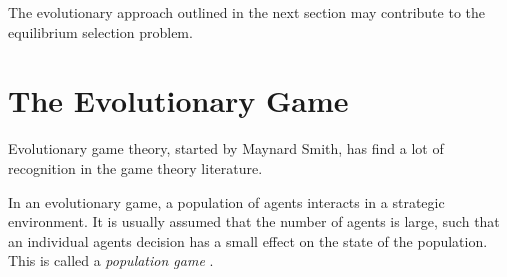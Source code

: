 \documentclass[11pt]{article}
\begin{document}
The evolutionary approach outlined in the next section may contribute to 
the equilibrium selection problem. 

\section{The Evolutionary Game}
\label{evolutionarysection}
Evolutionary game theory, started by Maynard Smith, has find a lot of 
recognition in the game theory literature. 

In an evolutionary game, a population of agents interacts in a 
strategic environment. It is usually assumed that the number of agents is 
large, such that an individual agents decision has a small effect on the
state of the population. This is called a \textit{population game} \cite{sandholm_population_2010}.
\end{document}
